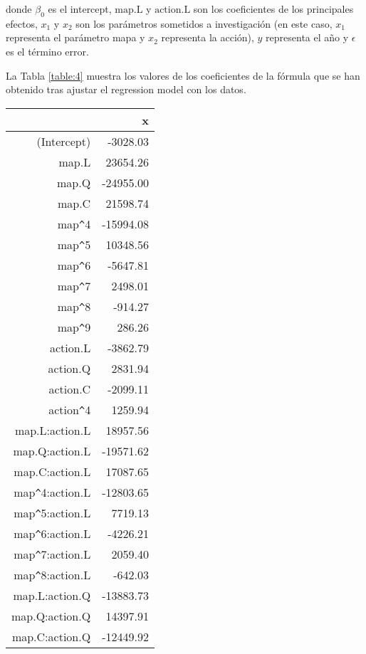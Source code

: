 \documentclass[10pt,a4paper]{article}
\begin{document}
donde $\beta_0$ es el intercept, $\mbox{map.L}$ y $\mbox{action.L}$ son los coeficientes de los principales efectos, $x_1$ y $x_2$ son los parámetros sometidos a investigación (en este caso, $x_1$ representa el parámetro mapa y $x_2$ representa la acción), $y$ representa el año y $\epsilon$ es el término error.

La Tabla \ref{table:4} muestra los valores de los coeficientes de la fórmula que se han obtenido tras ajustar el regression model con los datos.

\begin{table}[ht]
\centering
\begin{tabular}{rr}
  \hline
 & x \\ 
  \hline
(Intercept) & -3028.03 \\ 
  map.L & 23654.26 \\ 
  map.Q & -24955.00 \\ 
  map.C & 21598.74 \\ 
  map\verb|^|4 & -15994.08 \\ 
  map\verb|^|5 & 10348.56 \\ 
  map\verb|^|6 & -5647.81 \\ 
  map\verb|^|7 & 2498.01 \\ 
  map\verb|^|8 & -914.27 \\ 
  map\verb|^|9 & 286.26 \\ 
  action.L & -3862.79 \\ 
  action.Q & 2831.94 \\ 
  action.C & -2099.11 \\ 
  action\verb|^|4 & 1259.94 \\ 
  map.L:action.L & 18957.56 \\ 
  map.Q:action.L & -19571.62 \\ 
  map.C:action.L & 17087.65 \\ 
  map\verb|^|4:action.L & -12803.65 \\ 
  map\verb|^|5:action.L & 7719.13 \\ 
  map\verb|^|6:action.L & -4226.21 \\ 
  map\verb|^|7:action.L & 2059.40 \\ 
  map\verb|^|8:action.L & -642.03 \\ 
  map.L:action.Q & -13883.73 \\ 
  map.Q:action.Q & 14397.91 \\ 
  map.C:action.Q & -12449.92 \\ 

\end{tabular}
\end{table}
\end{document}
